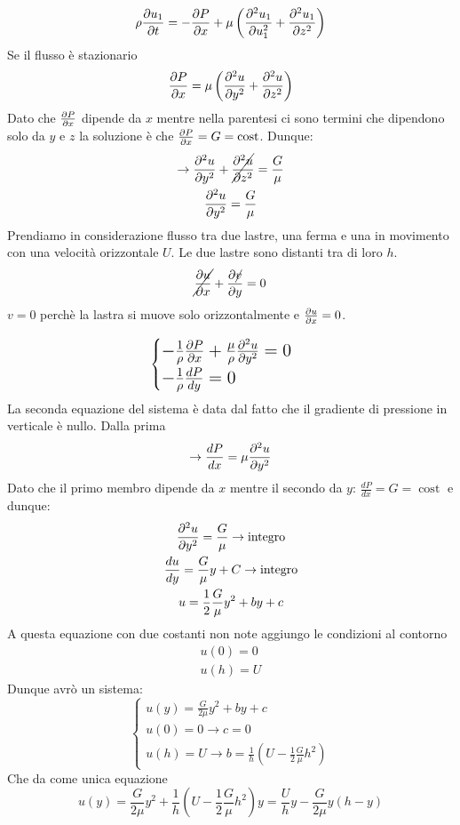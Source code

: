\[
  \rho \frac{\partial u_1}{\partial t}= - \frac{\partial P}{\partial x}+\mu \left( \frac{\partial^2u_1}{\partial u_1^2} + \frac{\partial^2u_1}{\partial z^2}\right)
\]
Se il flusso è stazionario
\[
  \frac{\partial P}{\partial x}=\mu\left( \frac{\partial^2u}{\partial y^2}+\frac{\partial^2u}{\partial z^2}\right)  
\]
Dato che $ \frac{\partial P}{\partial x}$ dipende da $ x $ mentre nella parentesi ci sono termini che dipendono solo da $ y $ e $ z $ la soluzione è che $ \frac{\partial P}{\partial x}=G=\operatorname{cost}  $. Dunque:
\begin{gather*}
  \rightarrow \frac{\partial^2u}{\partial y^2}+\cancel{{\frac{\partial^2u}{\partial z^2}}} = \frac{G}{\mu }\\
  \frac{\partial^2u}{\partial y^2}=\frac{G}{\mu }
\end{gather*}
Prendiamo in considerazione flusso tra due lastre, una ferma e una in movimento con una velocità orizzontale $ U $.
Le due lastre sono distanti tra di loro $ h $.
\[
  \cancel{\frac{\partial u}{\partial x}}+\frac{\partial\cancel{v}}{\partial y}=0
\] 
$ v = 0 $ perchè la lastra si muove solo orizzontalmente e $ \frac{\partial u}{\partial x}=0 $.

\begin{equation*}
  \Large
  \begin{cases}
    -\frac{1}{\rho }\frac{\partial P}{\partial x}+\frac{\mu}{\rho }\frac{\partial^2u}{\partial y^2}=0\\
    -\frac{1}{\rho }\frac{dP}{dy}= 0
  \end{cases}
\end{equation*}
La seconda equazione del sistema è data dal fatto che il gradiente di pressione in verticale è nullo. Dalla prima 
\begin{gather*}
  \rightarrow \frac{dP}{dx}=\mu \frac{\partial^2u}{\partial y^2}
\end{gather*}
Dato che il primo membro dipende da $ x $ mentre il secondo da $ y $: $ \frac{dP}{dx}=G=\operatorname{cost}  $ e dunque:
\begin{gather*}
  \frac{\partial^2u}{\partial y^2}=\frac{G}{\mu } \rightarrow \text{integro}\\
  \frac{du}{dy}=\frac{G}{\mu }y+C \rightarrow \text{integro}\\
  u = \frac{1}{2}\frac{G}{\mu }y^2+by+c
\end{gather*}
A questa equazione con due costanti non note aggiungo le condizioni al contorno 
\begin{gather*}
  u\left( 0\right) =0\\
  u\left( h\right) =U
\end{gather*}
Dunque avrò un sistema:
\begin{equation}
  \begin{cases}
    u\left( y\right) =\frac{G}{2\mu }y^2+by+c\\
    u\left( 0\right) =0 \to c=0\\
    u\left( h\right) =U \to b = \frac{1}{h}\left( U-\frac{1}{2}\frac{G}{\mu }h^2\right) 
  \end{cases}
\end{equation}
Che da come unica equazione 
\begin{equation}
  u\left( y\right) =\frac{G}{2\mu }y^2+\frac{1}{h}\left( U-\frac{1}{2}\frac{G}{\mu  }h^2\right) y= \frac{U}{h}y-\frac{G}{2\mu }y\left( h-y\right) 
\end{equation}


